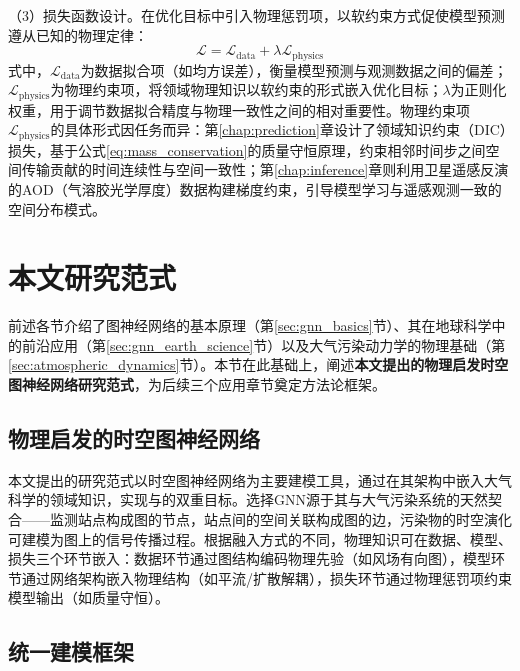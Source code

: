 （3）损失函数设计。在优化目标中引入物理惩罚项，以软约束方式促使模型预测遵从已知的物理定律：
\begin{equation}
\mathcal{L} = \mathcal{L}_{\text{data}} + \lambda \mathcal{L}_{\text{physics}}
\label{eq:physics_loss}
\end{equation}
\noindent 式中，$\mathcal{L}_{\text{data}}$为数据拟合项（如均方误差），衡量模型预测与观测数据之间的偏差；$\mathcal{L}_{\text{physics}}$为物理约束项，将领域物理知识以软约束的形式嵌入优化目标；$\lambda$为正则化权重，用于调节数据拟合精度与物理一致性之间的相对重要性。物理约束项$\mathcal{L}_{\text{physics}}$的具体形式因任务而异：第\ref{chap:prediction}章设计了领域知识约束（DIC）损失，基于公式\eqref{eq:mass_conservation}的质量守恒原理，约束相邻时间步之间空间传输贡献的时间连续性与空间一致性；第\ref{chap:inference}章则利用卫星遥感反演的AOD（气溶胶光学厚度）数据构建梯度约束，引导模型学习与遥感观测一致的空间分布模式。


\section{本文研究范式}
\label{sec:our_paradigm}

前述各节介绍了图神经网络的基本原理（第\ref{sec:gnn_basics}节）、其在地球科学中的前沿应用（第\ref{sec:gnn_earth_science}节）以及大气污染动力学的物理基础（第\ref{sec:atmospheric_dynamics}节）。本节在此基础上，阐述\textbf{本文提出的物理启发时空图神经网络研究范式}，为后续三个应用章节奠定方法论框架。

\subsection{物理启发的时空图神经网络}
\label{subsec:core_idea}

本文提出的研究范式以时空图神经网络为主要建模工具，通过在其架构中嵌入大气科学的领域知识，实现与的双重目标。选择GNN源于其与大气污染系统的天然契合——监测站点构成图的节点，站点间的空间关联构成图的边，污染物的时空演化可建模为图上的信号传播过程。根据融入方式的不同，物理知识可在数据、模型、损失三个环节嵌入\citep{willard2022integrating}：数据环节通过图结构编码物理先验（如风场有向图），模型环节通过网络架构嵌入物理结构（如平流/扩散解耦），损失环节通过物理惩罚项约束模型输出（如质量守恒）。

\subsection{统一建模框架}
\label{subsec:unified_framework}


